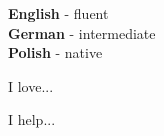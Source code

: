 \documentclass[8pt]{developercv} %
\begin{document}

\begin{minipage}[t]{0.3\textwidth}
	\vspace{-\baselineskip} %

	
	\textbf{English} - fluent\\
	\textbf{German} - intermediate\\
	\textbf{Polish} - native
\end{minipage}
\hfill
\begin{minipage}[t]{0.3\textwidth}
	\vspace{-\baselineskip} %
	
	
	I love... \lorem
\end{minipage}
\hfill
\begin{minipage}[t]{0.3\textwidth}
	\vspace{-\baselineskip} %
	
	
	I help... \lorem
\end{minipage}

\end{document}
